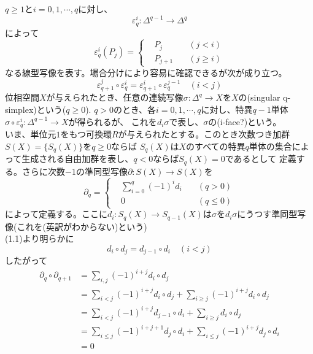 \documentclass[dvipdfmx,a4paper,11pt]{jsarticle}
\begin{document}
$q\geq 1$と$i=0,1,\cdots,q$に対し、
\begin{equation*}
  \varepsilon^{i}_{q}:\Delta^{q-1}\to \Delta^{q}
\end{equation*}
によって
\begin{equation*}
  \varepsilon^{i}_{q}(P_{j})=\left\{
    \begin{alignedat}{2}
      &P_{j}\quad &(j<i)\\
      &P_{j+1}\quad &(j\geq i)
    \end{alignedat}
  \right.
\end{equation*}
なる線型写像を表す。場合分けにより容易に確認できるが次が成り立つ。
\begin{equation}
  \varepsilon^{j}_{q+1} \circ \varepsilon^{i}_{q}=\varepsilon^{i}_{q+1}\circ \varepsilon^{j-1}_{q}\quad (i<j)
\end{equation}
位相空間$X$が与えられたとき、任意の連続写像$\sigma : \Delta^{q}\to X$を$X$の(singular q-simplex)という($q\geq 0$).
$q>0$のとき、各$i=0,1,\cdots,q$に対し、特異$q-1$単体$\sigma \circ \varepsilon^{i}_{q} : \Delta^{q-1}\to X$が得られるが、
これを$d_{i}\sigma$で表し、$\sigma$の(i-face?)という。\\
いま、単位元$1$をもつ可換環$R$が与えられたとする。このとき次数つき加群$S(X)=\{S_{q}(X)\}$を$q\geq 0$ならば
$S_{q}(X)$は$X$のすべての特異$q$単体の集合によって生成される自由加群を表し、$q<0$ならば$S_{q}(X)=0$であるとして
定義する。さらに次数$-1$の準同型写像$\partial : S(X)\to S(X)$を
\begin{equation*}
  \partial_{q}=\left\{
  \begin{alignedat}{2}
    &\sum_{i=0}^{q}(-1)^{i}d_{i}\quad &(q>0)\\
    &0 \quad &(q\leq 0)
  \end{alignedat}
  \right.
\end{equation*}
によって定義する。ここに$d_{i}:S_{q}(X)\to S_{q-1}(X)$は$\sigma$を$d_{i}\sigma$にうつす準同型写像(これを(英訳がわからない)という)\\
(1.1)より明らかに
\begin{equation}
  d_{i}\circ d_{j}=d_{j-1}\circ d_{i}\quad (i<j)
\end{equation}
したがって
\begin{align*}
  \partial_{q}\circ \partial_{q+1}
  &=\sum_{i,j}(-1)^{i+j}d_{i}\circ d_{j}\\
  &=\sum_{i<j}(-1)^{i+j}d_{i}\circ d_{j} + \sum_{i\geq j}(-1)^{i+j}d_{i}\circ d_{j}\\
  &=\sum_{i<j}(-1)^{i+j}d_{j-1}\circ d_{i} + \sum_{i\geq j}d_{i}\circ d_{j}\\
  &=\sum_{i\leq j}(-1)^{i+j+1}d_{j}\circ d_{i} + \sum_{i\leq j}(-1)^{i+j}d_{j}\circ d_{i}\\
  &=0
\end{align*}
\end{document}
